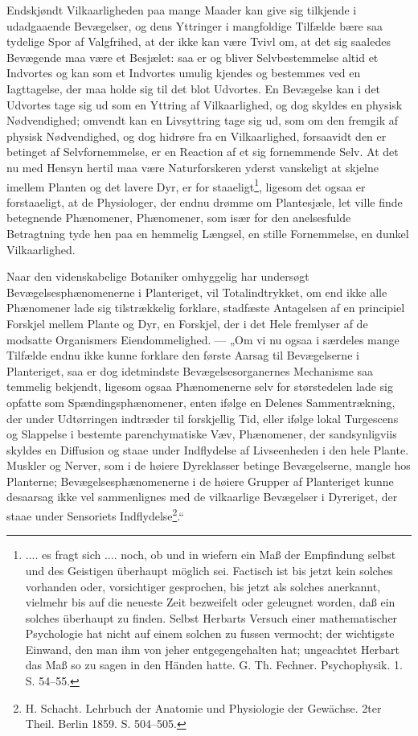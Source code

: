\documentclass[11pt]{book}
\newcommand{\opage}[1]{\marginnote{\footnotesize\textit{[#1]}}}
\begin{document}
Endskjøndt Vilkaarligheden paa mange Maader kan give sig tilkjende i
udadgaaende Bevægelser, og dens Yttringer i mangfoldige Tilfælde bære saa
tydelige Spor af Valgfrihed, at der ikke kan være Tvivl om, at det sig
saaledes Bevægende maa være et Besjælet: saa er og bliver Selvbestemmelse
altid et Indvortes og kan som et Indvortes umulig kjendes og bestemmes ved en
Iagttagelse, der maa holde sig til det blot Udvortes. En Bevægelse kan i det
Udvortes tage sig ud som en Yttring af Vilkaarlighed, og dog skyldes en
physisk Nødvendighed; omvendt kan en Livsyttring tage sig ud, som om den
fremgik af physisk Nødvendighed, og dog hidrøre fra en Vilkaarlighed,
forsaavidt den er betinget af Selvfornemmelse, er en Reaction af et sig
fornemmende Selv. At det nu med Hensyn hertil maa være Naturforskeren yderst
vanskeligt at skjelne imellem Planten og det lavere Dyr, er for\-%
\opage{340} \setcounter{footnote}{0}%
staaeligt\footnote{%
.... es fragt sich .... noch, ob und in wiefern ein Maß der Empfindung selbst
und des Geistigen überhaupt möglich sei. Factisch ist bis jetzt kein solches
vorhanden oder, vorsichtiger gesprochen, bis jetzt als solches anerkannt,
vielmehr bis auf die neueste Zeit bezweifelt oder geleugnet worden, daß ein
solches überhaupt zu finden. Selbst Herbarts Versuch einer mathematischer
Psychologie hat nicht auf einem solchen zu fussen vermocht; der wichtigste
Einwand, den man ihm von jeher entgegengehalten hat; ungeachtet Herbart das
Maß so zu sagen in den Händen hatte. G. Th. Fechner. Psychophysik. 1.
S. 54--55.}, ligesom det ogsaa er forstaaeligt, at de Physiologer, der endnu
drømme om Plantesjæle, let ville finde betegnende Phænomener, Phænomener, som
især for den anelsesfulde Betragtning tyde hen paa en hemmelig Længsel, en
stille Fornemmelse, en dunkel Vilkaarlighed.

Naar den videnskabelige Botaniker omhyggelig har undersøgt
Bevægelsesphænomenerne i Planteriget, vil Totalindtrykket, om end ikke alle
Phænomener lade sig tilstrækkelig forklare, stadfæste Antagelsen af en
principiel Forskjel mellem Plante og Dyr, en Forskjel, der i det Hele
fremlyser af de modsatte Organismers Eiendommelighed. --- „Om vi nu ogsaa i
særdeles mange Tilfælde endnu ikke kunne forklare den første Aarsag til
Bevægelserne i Planteriget, saa er dog idetmindste Bevægelsesorganernes
Mechanisme saa temmelig bekjendt, ligesom ogsaa Phænomenerne selv for
størstedelen lade sig opfatte som Spændingsphænomener, enten ifølge en
Delenes Sammentrækning, der under Udtørringen indtræder til forskjellig Tid,
eller ifølge lokal Turgescens og Slappelse i bestemte parenchymatiske Væv,
Phænomener, der sandsynligviis skyldes en Diffusion og staae under Indflydelse
af Livseenheden i den hele Plante. Muskler og Nerver, som i de høiere
Dyreklasser betinge Bevægelserne, mangle hos Planterne;
Bevægelsesphænomenerne i de høiere Grupper af Planteriget kunne desaarsag
ikke vel sammenlignes med de
\opage{341} \setcounter{footnote}{0}%
vilkaarlige Bevægelser i Dyreriget, der staae under Sensoriets
Indflydelse\footnote{%
H. Schacht. Lehrbuch der Anatomie und Physiologie der Gewächse. 2ter Theil.
Berlin 1859. S. 504--505.}.“
\end{document}
